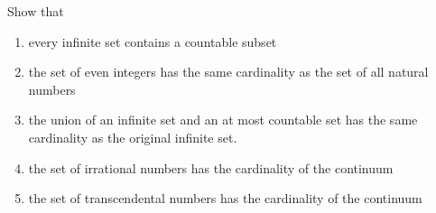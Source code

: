   \begin{exercise}[Zorich 2.4.3]
    Show that 
    \begin{enumerate}
      \item every infinite set contains a countable subset
      \item the set of even integers has the same cardinality as the set of all natural numbers
      \item the union of an infinite set and an at most countable set has the same cardinality as the original infinite set. 
      \item the set of irrational numbers has the cardinality of the continuum 
      \item the set of transcendental numbers has the cardinality of the continuum
    \end{enumerate}
  \end{exercise}
